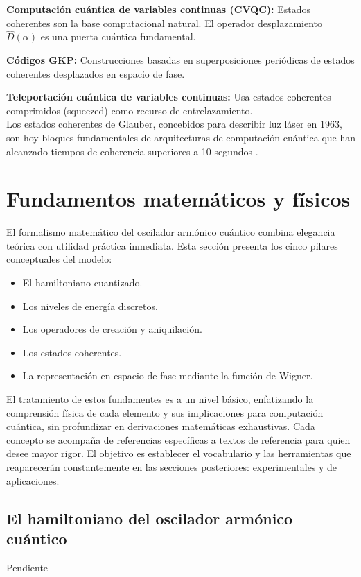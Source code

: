\documentclass[11pt,a4paper,spanish]{book}
\begin{document}
\textbf{Computación cuántica de variables continuas (CVQC):} \citep{braunstein2005, bourassa2021}
Estados coherentes son la base computacional natural. El operador desplazamiento $\hat{D}(\alpha)$ es una puerta cuántica fundamental.

\textbf{Códigos GKP:} \citep{gkp2001}
Construcciones basadas en superposiciones periódicas de estados coherentes desplazados en espacio de fase.

\textbf{Teleportación cuántica de variables continuas:} \citep{braunstein2005}
Usa estados coherentes comprimidos (squeezed) como recurso de entrelazamiento.\\

Los estados coherentes de Glauber, concebidos para describir luz láser en 1963, son hoy bloques fundamentales de arquitecturas de computación cuántica que han alcanzado tiempos de coherencia superiores a 10 segundos \cite{reglade2024}.


\section{Fundamentos matemáticos y físicos}

El formalismo matemático del oscilador armónico cuántico combina elegancia teórica con utilidad práctica inmediata. Esta sección presenta los cinco pilares conceptuales del modelo: 

\begin{itemize}
	\item El hamiltoniano cuantizado.
	\item Los niveles de energía discretos.
	\item Los operadores de creación y aniquilación.
	\item Los estados coherentes.
	\item La representación en espacio de fase mediante la función de Wigner.
\end{itemize}

El tratamiento de estos fundamentes es a un nivel básico, enfatizando la comprensión física de cada elemento y sus implicaciones para computación cuántica, sin profundizar en derivaciones matemáticas exhaustivas. Cada concepto se acompaña de referencias específicas a textos de referencia para quien desee mayor rigor. El objetivo es establecer el vocabulario y las herramientas que reaparecerán constantemente en las secciones posteriores: experimentales y de aplicaciones.



\subsection*{El hamiltoniano del oscilador armónico cuántico}
Pendiente
\end{document}

